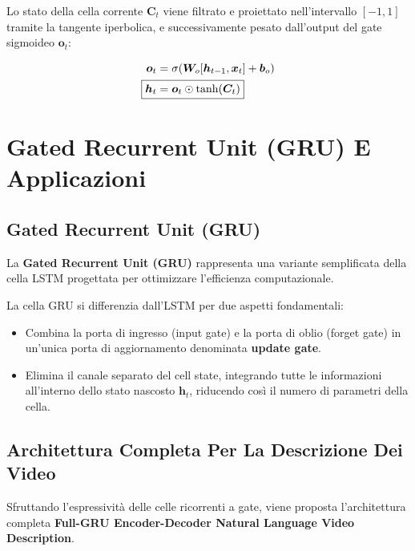 ﻿\documentclass[11pt, a4paper]{article}
\begin{document}

Lo stato della cella corrente $\bm{C}_t$ viene filtrato e proiettato nell'intervallo $[-1, 1]$ tramite la tangente iperbolica, e successivamente pesato dall'output del gate sigmoideo $\bm{o}_t$:

\begin{align*}
\bm{o}_t &= \sigma(\bm{W}_o [\bm{h}_{t-1}, \bm{x}_t] + \bm{b}_o) \\
\Aboxed{\bm{h}_t &= \bm{o}_t \odot \tanh(\bm{C}_t)}
\end{align*}

\newpage

\section{Gated Recurrent Unit (GRU) E Applicazioni}

\subsection{Gated Recurrent Unit (GRU)}

La \textbf{Gated Recurrent Unit (GRU)} rappresenta una variante semplificata della cella LSTM progettata per ottimizzare l'efficienza computazionale.


La cella GRU si differenzia dall'LSTM per due aspetti fondamentali:
\begin{itemize}[noitemsep]
    \item Combina la porta di ingresso (input gate) e la porta di oblio (forget gate) in un'unica porta di aggiornamento denominata \textbf{update gate}.
    \item Elimina il canale separato del cell state, integrando tutte le informazioni all'interno dello stato nascosto $\bm{h}_t$, riducendo così il numero di parametri della cella.
\end{itemize}

\subsection{Architettura Completa Per La Descrizione Dei Video}

Sfruttando l'espressività delle celle ricorrenti a gate, viene proposta l'architettura completa \textbf{Full-GRU Encoder-Decoder Natural Language Video Description}.
\end{document}
